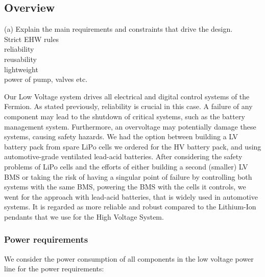 \subsection{Overview}
\graphicspath{ {./texfiles/electrical/eimc/} }
(a) Explain the main requirements and constraints that drive the design. \\
Strict EHW rules \\
reliability \\
reusability \\
lightweight \\
power of pump, valves etc. 

\par Our Low Voltage system drives all electrical and digital control systems of the Fermion. As stated previously,
reliability is crucial in this case. A failure of any component may lead to the shutdown of critical systems, such as the battery management system.
Furthermore, an overvoltage may potentially damage these systems, causing safety hazards. We had the option between building a LV battery pack from spare LiPo cells we ordered for the HV battery pack, and using automotive-grade ventilated lead-acid batteries.
After considering the safety problems of LiPo cells and the efforts of either building a second (smaller) LV BMS or taking the risk of having a singular point of failure by controlling both systems with the same BMS, powering the BMS with the cells it controls, we went for the approach with lead-acid batteries, that is widely used in automotive systems. It is regarded as more reliable and robust compared to the Lithium-Ion pendants that we use for the High Voltage System. \\
\subsubsection*{Power requirements}
We consider the power consumption of all components in the low voltage power line for the power requirements:

